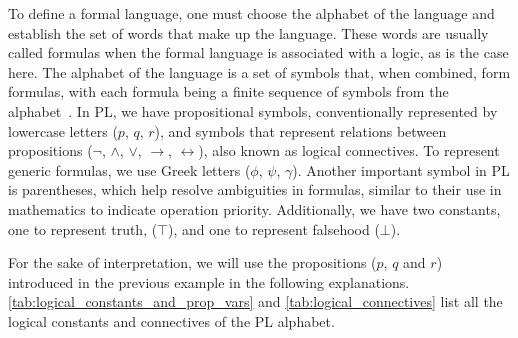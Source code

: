 To define a formal language, one must choose the alphabet of the language and establish the set of words that make up the language. These words are usually called formulas when the formal language is associated with a logic, as is the case here. The alphabet of the language is a set of symbols that, when combined, form formulas, with each formula being a finite sequence of symbols from the alphabet~\cite{gouveia_lgica}. In \gls{PL}, we have propositional symbols, conventionally represented by lowercase letters (\(p\), \(q\), \(r\)), and symbols that represent relations between propositions (\(\neg\), \(\land\), \(\lor\), \(\to\), \(\leftrightarrow\)), also known as logical connectives. To represent generic formulas, we use Greek letters (\(\phi\), \(\psi\), \(\gamma\)). Another important symbol in \gls{PL} is parentheses, which help resolve ambiguities in formulas, similar to their use in mathematics to indicate operation priority. Additionally, we have two constants, one to represent truth, (\(\top\)), and one to represent falsehood (\(\bot\)).

For the sake of interpretation, we will use the propositions (\(p\), \(q\) and \(r\)) introduced in the previous example in the following explanations. \autoref{tab:logical_constants_and_prop_vars} and \autoref{tab:logical_connectives} list all the logical constants and connectives of the \gls{PL} alphabet.

\begin{table}[h!]
    \centering
    \caption{Logical constants in Propositional Logic}
    \label{tab:logical_constants_and_prop_vars}
\end{table}

\begin{table}[h!]
    \centering
    \caption{Logical connectives in Propositional Logic}
    \label{tab:logical_connectives}
\end{table}

